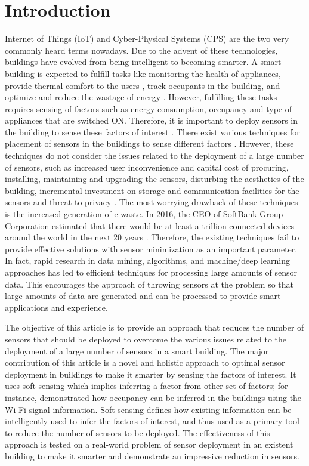\section{Introduction}
\label{intro}

Internet of Things (IoT) and Cyber-Physical Systems (CPS) are the two very commonly heard terms nowadays. Due to the advent of these technologies, buildings have evolved from being intelligent to becoming smarter. A smart building is expected to fulfill tasks like monitoring the health of appliances, provide thermal comfort to the users \citep{elsevier_hvac}, track occupants in the building, and optimize and reduce the wastage of energy \citep{karmakar}. However, fulfilling these tasks requires sensing of factors such as energy consumption, occupancy and type of appliances that are switched ON. Therefore, it is important to deploy sensors in the building to sense these factors of interest \citep{anshul_sensys_demo}. 
There exist various techniques for placement of sensors in the buildings to sense different factors \citep{bellala_electrons, meyn}. However, these techniques do not consider the issues related to the deployment of a large number of sensors, such as increased user inconvenience and capital cost of procuring, installing, maintaining and upgrading the sensors, disturbing the aesthetics of the building, incremental investment on storage and communication facilities for the sensors and threat to privacy \citep{hitchhiker_sensors,stankovic_iot}. The most worrying drawback of these techniques is the increased generation of e-waste. 
In 2016, the CEO of SoftBank Group Corporation estimated that there would be at least a trillion connected devices around the world in the next 20 years \citep{IntofTrash}. Therefore, the existing techniques fail to provide effective solutions with sensor minimization as an important parameter.
In fact, rapid research in data mining, algorithms, and machine/deep learning approaches has led to efficient techniques for processing large amounts of sensor data. This encourages the approach of throwing sensors at the problem so that large amounts of data are generated and can be processed to provide smart applications and experience. 

The objective of this article is to provide an approach that reduces the number of sensors that should be deployed to overcome the various issues related to the deployment of a large number of sensors in a smart building. The major contribution of this article is a novel and holistic approach to optimal sensor deployment in buildings to make it smarter by sensing the factors of interest. It uses soft sensing which implies inferring a factor from other set of factors; 
for instance, \cite{occupancy_wifi} demonstrated how occupancy can be inferred in the buildings using the Wi-Fi signal information. 
Soft sensing  
defines how existing information can be intelligently used to infer the factors of interest, and thus used as a primary tool to  reduce the number of sensors to be deployed. 
The effectiveness of this approach is tested on a real-world problem of sensor deployment in an existent building to make it smarter and demonstrate an impressive reduction in sensors.


